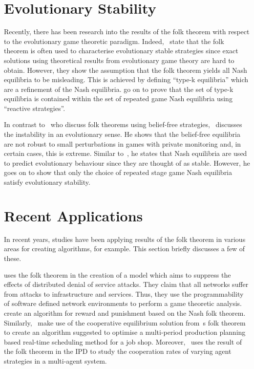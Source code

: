 \section{Evolutionary Stability}\label{sec:Evolutionary_Stability}
Recently, there has been research into the results of the folk theorem with
respect to the evolutionary game theoretic paradigm. Indeed,~\cite{Li2015} state
that the folk theorem is often used to characterise evolutionary stable
strategies since exact solutions using theoretical results from evolutionary
game theory are hard to obtain. However, they show the assumption that the folk
theorem yields all Nash equilibria to be misleading. This is achieved by
defining ``type-k equilibria'' which are a refinement of the Nash equilibria.
\cite{Li2015} go on to prove that the set of type-k equilibria is contained
within the set of repeated game Nash equilibria using ``reactive strategies''.

In contrast to~\cite{Yamamoto2009,
Yamamoto2012, Ely2005} who discuss folk theorems using belief-free
strategies,~\cite{Heller2017} discusses the instability in an evolutionary
sense. He shows that the belief-free equilibria are not robust to small
perturbations in games with private monitoring and, in certain cases, this is
extreme. Similar to~\cite{Li2015}, he states that Nash equilibria are used to
predict evolutionary behaviour since they are thought of as stable. However, he
goes on to show that only the choice of repeated stage game Nash equilibria
satisfy evolutionary stability.  


\section{Recent Applications}\label{sec:Recent_Applications}
In recent years, studies have been applying results of the folk theorem in
various areas for creating algorithms, for example. This section briefly
discusses a few of these.

\cite{Chowdhary2017} uses the folk theorem in the creation of a model which aims
to suppress the effects of distributed denial of service attacks. They claim
that all networks suffer from attacks to infrastructure and services. Thus, they
use the programmability of software defined network environments to perform a
game theoretic analysis. \cite{Chowdhary2017} create an algorithm for reward and
punishment based on the Nash folk theorem. Similarly,~\cite{Wang2020} make use
of the cooperative equilibrium solution from~\cite{Friedman1971}s folk theorem
to create an algorithm suggested to optimise a multi-period production planning
based real-time scheduling method for a job shop. Moreover,~\cite{Wang2018} uses
the result of the folk theorem in the IPD to study the cooperation rates of
varying agent strategies in a multi-agent system.


